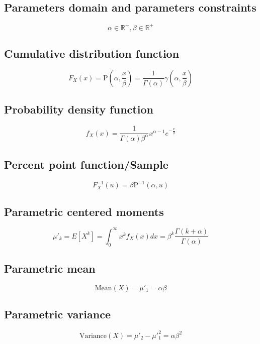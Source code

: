 \documentclass{article}
\begin{document}
\subsection{Parameters domain and parameters constraints}
\begin{equation*} \alpha\in\mathbb{R}^{+}, \beta\in\mathbb{R}^{+} \end{equation*}
\subsection{Cumulative distribution function}
\begin{equation*} F_{X}\left(x\right)=\text{P}\left(\alpha,\frac{x}{\beta}\right)=\frac{1}{\Gamma(\alpha)} \gamma\left(\alpha,\frac{x}{\beta}\right) \end{equation*}
\subsection{Probability density function}
\begin{equation*} f_{X}\left(x\right)=\frac{1}{\Gamma(\alpha) \beta^\alpha} x^{\alpha-1} e^{-\frac{x}{\beta}} \end{equation*}
\subsection{Percent point function/Sample}
\begin{equation*} F^{-1}_{X}\left(u\right)=\beta \text{P}^{-1}\left(\alpha,u\right) \end{equation*}
\subsection{Parametric centered moments}
\begin{equation*} \mu'_{k}=E[X^k]=\int_{0}^{\infty }x^{k}f_{X}\left(x\right)dx=\beta^k\frac{\Gamma(k+\alpha)}{\Gamma(\alpha)} \end{equation*}
\subsection{Parametric mean}
\begin{equation*} \mathrm{Mean}(X)=\mu'_{1}=\alpha \beta \end{equation*}
\subsection{Parametric variance}
\begin{equation*} \mathrm{Variance}(X)=\mu'_{2}-\mu'^{2}_{1}=\alpha \beta^2 \end{equation*}
\end{document}
